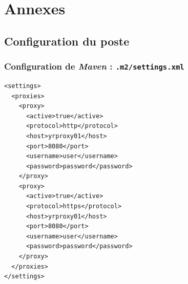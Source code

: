 \documentclass[small,algo]{dushClass}
\begin{document}
\clearpage
\section{Annexes}
\lstset{language=XML}

\subsection{Configuration du poste}

\subsubsection{Configuration de \emph{Maven} : \texttt{.m2/settings.xml}}\label{mvn-settings}
\begin{lstlisting}
<settings>
  <proxies>  
    <proxy>
      <active>true</active>
      <protocol>http</protocol>
      <host>yrproxy01</host>
      <port>8080</port>
      <username>user</username>
      <password>password</password>
    </proxy>
    <proxy>
      <active>true</active>
      <protocol>https</protocol>
      <host>yrproxy01</host>
      <port>8080</port>
      <username>user</username>
      <password>password</password>
    </proxy>    
  </proxies>  
</settings>

\end{lstlisting}
\end{document}
